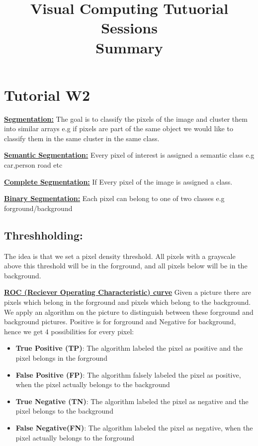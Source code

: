 \documentclass[8pt]{extreport}
\title{Visual Computing Tutuorial Sessions\\ Summary}
\begin{document}
	\maketitle
	\newpage
\chapter{Tutorial W2}

\underline{\textbf{Segmentation:}} The goal is to classify the pixels of the image and cluster them into similar arrays e.g if pixels are part of the same object we would like to classify them in the same cluster in the same class.

\underline{\textbf{Semantic Segmentation:}} Every pixel of interest is assigned a semantic class e.g car,person road etc

\underline{\textbf{Complete Segmentation:}} If Every pixel of the image is assigned a class.

\underline{\textbf{Binary Segmentation:}} Each pixel can belong to one of two classes e.g forground/background

\section{Threshholding:} The idea is that we set a pixel density threshold. All pixels with a grayscale above this threshold will be in the forground, and all pixels below will be in the background.

\underline{\textbf{ROC (Reciever Operating Characteristic) curve}} Given a picture there are pixels which belong in the forground and pixels which belong to the background. We apply an algorithm on the picture to distinguish between these forground and background pictures. Positive is for forground and Negative for background, hence we get 4 possibilities for every pixel:
\begin{itemize}
\item \textbf{True Positive (TP)}: The algorithm labeled the pixel as positive and the pixel belongs in the forground
\item \textbf{False Positive (FP)}: The algorithm falsely labeled the pixel as positive, when the pixel actually belongs to the background
\item \textbf{True Negative (TN)}: The algorithm labeled the pixel as negative and the pixel belongs to the background 
\item \textbf{False Negative(FN)}: The algorithm labeled the pixel as negative, when the pixel actually belongs to the forground
\end{itemize}
\end{document}
